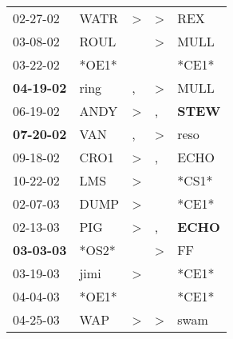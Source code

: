 \begin{supertabular}{p{0.07\textwidth}p{0.06\textwidth}p{0.02\textwidth}p{0.02\textwidth}p{0.06\textwidth}}
          02-27-02\textsuperscript{} &           WATR\textsuperscript{} &     \textgreater &     \textgreater &            REX\textsuperscript{} \\
          03-08-02\textsuperscript{} &           ROUL\textsuperscript{} &                  &     \textgreater &           MULL\textsuperscript{} \\
          03-22-02\textsuperscript{} &                            *OE1* &                  &                  &                            *CE1* \\
 \textbf{04-19-02\textsuperscript{}} &           ring\textsuperscript{} &                , &     \textgreater &           MULL\textsuperscript{} \\
          06-19-02\textsuperscript{} &           ANDY\textsuperscript{} &     \textgreater &                , &  \textbf{STEW\textsuperscript{}} \\
 \textbf{07-20-02\textsuperscript{}} &            VAN\textsuperscript{} &                , &     \textgreater &           reso\textsuperscript{} \\
          09-18-02\textsuperscript{} &           CRO1\textsuperscript{} &     \textgreater &                , &           ECHO\textsuperscript{} \\
          10-22-02\textsuperscript{} &            LMS\textsuperscript{} &     \textgreater &                  &                            *CS1* \\
          02-07-03\textsuperscript{} &           DUMP\textsuperscript{} &     \textgreater &                  &                            *CE1* \\
          02-13-03\textsuperscript{} &            PIG\textsuperscript{} &     \textgreater &                , &  \textbf{ECHO\textsuperscript{}} \\
 \textbf{03-03-03\textsuperscript{}} &                            *OS2* &                  &     \textgreater &             FF\textsuperscript{} \\
          03-19-03\textsuperscript{} &           jimi\textsuperscript{} &     \textgreater &                  &                            *CE1* \\
          04-04-03\textsuperscript{} &                            *OE1* &                  &                  &                            *CE1* \\
          04-25-03\textsuperscript{} &            WAP\textsuperscript{} &     \textgreater &     \textgreater &           swam\textsuperscript{} \\

\end{supertabular}
